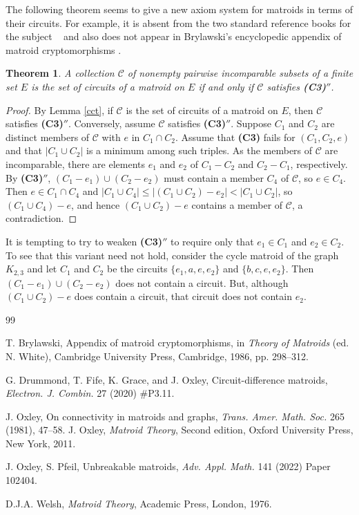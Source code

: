 \documentclass[12pt,reqno]{amsart}
\newtheorem{theorem}{Theorem}[section]
\theoremstyle{definition}
\theoremstyle{remark}
\numberwithin{equation}{section}
\begin{document}
The following theorem seems to give a new axiom system for matroids in terms of their circuits. For example, it is absent from the two standard reference books for the subject ~\cite{ox, djaw} and also does not appear in Brylawski's encyclopedic appendix of matroid cryptomorphisms \cite{thb}. 

\begin{theorem}
\label{cct2}
A collection ${\mathscr C}$ of nonempty pairwise incomparable subsets of a finite set $E$ is the set of circuits of a matroid on $E$ if and only if ${\mathscr C}$ satisfies {\bf (C3)$''$}.
\end{theorem}

\begin{proof}
 By Lemma \ref{cct}, if ${\mathscr C}$ is the set of circuits of a matroid on $E$, then ${\mathscr C}$ satisfies {\bf (C3)$''$}. Conversely, assume ${\mathscr C}$ satisfies {\bf (C3)$''$}. Suppose $C_1$ and $C_2$ are  distinct members of  ${\mathscr C}$ with $e$ in $C_1 \cap C_2$. Assume that 
{\bf (C3)} fails for $(C_1,C_2,e)$ and that 
 $|C_1 \cup C_2|$ is a minimum among such triples. As the members of ${\mathscr C}$ are incomparable, there are elements $e_1$ and $e_2$ of $C_1 - C_2$ and $C_2 - C_1$, respectively. By {\bf (C3)$''$}, $(C_1 - e_1) \cup (C_2 - e_2)$ must contain a member $C_4$ of ${\mathscr C}$, so $e \in C_4$. Then $e \in C_1 \cap C_4$ and $|C_1 \cup C_4| \le |(C_1 \cup C_2) - e_2| < |C_1 \cup C_2|$, so $(C_1 \cup C_4) - e$, and hence  $(C_1 \cup C_2) - e$ contains a member of ${\mathscr C}$, a contradiction.
 \end{proof}
 
It is tempting to try to weaken {\bf (C3)$''$} to require only that $e_1 \in C_1$ and $e_2 \in C_2$. To see that this variant need not hold, consider the cycle matroid of the graph $K_{2,3}$  and let $C_1$ and $C_2$  be the circuits  $\{e_1, a, e,e_2\}$ and $\{b, c, e,e_2\}$.  Then $(C_1 - e_1) \cup (C_2 - e_2)$ does not contain a circuit. But, although $(C_1 \cup C_2) - e$ does contain a circuit, that circuit does not contain $e_2$.
 

\begin{thebibliography}{99}

 T. Brylawski, Appendix of matroid cryptomorphisms, in {\em  Theory of Matroids} (ed. N. White), Cambridge University Press, Cambridge, 1986, pp. 298--312.

 G. Drummond, T. Fife, K. Grace, and J. Oxley, Circuit-difference matroids, \textit{Electron. J. Combin.} 27 (2020) \#P3.11.

 J. Oxley, On connectivity in matroids and graphs, \textit{Trans. Amer. Math. Soc.} 265 (1981), 47--58.
 J. Oxley, \textit{Matroid Theory}, Second edition, Oxford University Press, New York, 2011.  


 J. Oxley, S. Pfeil, Unbreakable matroids, \textit{Adv. Appl. Math.} 141 (2022) Paper 102404. 

 D.J.A. Welsh, {\em Matroid Theory}, Academic Press, London, 1976.


\end{thebibliography}
\end{document}
